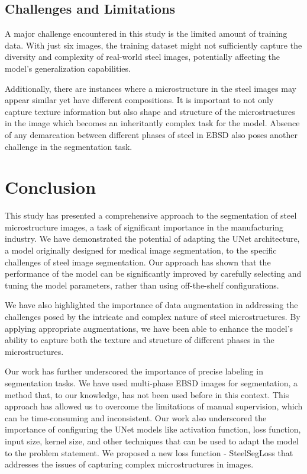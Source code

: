 \documentclass[]{article}
\begin{document}
\subsection{Challenges and Limitations}

A major challenge encountered in this study is the limited amount of training data. With just six images, the training dataset might not sufficiently capture the diversity and complexity of real-world steel images, potentially affecting the model's generalization capabilities. 

Additionally, there are instances where a microstructure in the steel images may appear similar yet have different compositions. It is important to not only capture texture information but also shape and structure of the microstructures in the image which becomes an inheritantly complex task for the model. Absence of any demarcation between different phases of steel in EBSD also poses another challenge in the segmentation task. 

\section{Conclusion}

This study has presented a comprehensive approach to the segmentation of steel microstructure images, a task of significant importance in the manufacturing industry. We have demonstrated the potential of adapting the UNet architecture, a model originally designed for medical image segmentation, to the specific challenges of steel image segmentation. Our approach has shown that the performance of the model can be significantly improved by carefully selecting and tuning the model parameters, rather than using off-the-shelf configurations.

We have also highlighted the importance of data augmentation in addressing the challenges posed by the intricate and complex nature of steel microstructures. By applying appropriate augmentations, we have been able to enhance the model's ability to capture both the texture and structure of different phases in the microstructures.

Our work has further underscored the importance of precise labeling in segmentation tasks.
We have used multi-phase EBSD images for segmentation, a method that, to our knowledge, has not been used before in this context. This approach has allowed us to overcome the limitations of manual supervision, which can be time-consuming and inconsistent. Our work also underscored the importance of configuring the UNet models like activation function, loss function, input size, kernel size, and other techniques that can be used to adapt the model to the problem statement. We proposed a new loss function - SteelSegLoss that addresses the issues of capturing complex microstructures in images.
\end{document}
